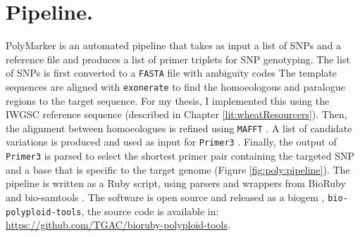 \section{Pipeline. }
PolyMarker is an automated pipeline that takes as input a list of SNPs and a reference file and produces a list of primer triplets for SNP genotyping. 
The list of SNPs is first converted to a \verb|FASTA| file with ambiguity codes \citep{Cornish-Bowden1985} 
The template sequences are aligned with \verb|exonerate| \citep{Slater2005}  to find the homoeologous and paralogue regions to the target sequence.
For my thesis, I implemented this using the IWGSC reference sequence (described in Chapter \ref{lit:wheatResourcers}).  
Then, the alignment between homoeologues is refined using \verb|MAFFT| \citep{Katoh2013}. 
A list of candidate variations is produced and used as input for \verb|Primer3| \citep{Rozen}. 
Finally, the output of \verb|Primer3| is parsed to select the shortest primer pair containing the targeted SNP and a base that is specific to the target genome (Figure \ref{fig:poly:pipeline}).  
The pipeline is written as a Ruby script, using parsers and wrappers from BioRuby \citep{Goto2010} and bio-samtools \citep{Etherington2015,Ramirez-Gonzalez2012}. 
The software is open source and released as a biogem \citep{Bonnal2012}, \verb|bio-polyploid-tools|, the source code is available in: \url{https://github.com/TGAC/bioruby-polyploid-tools}.


